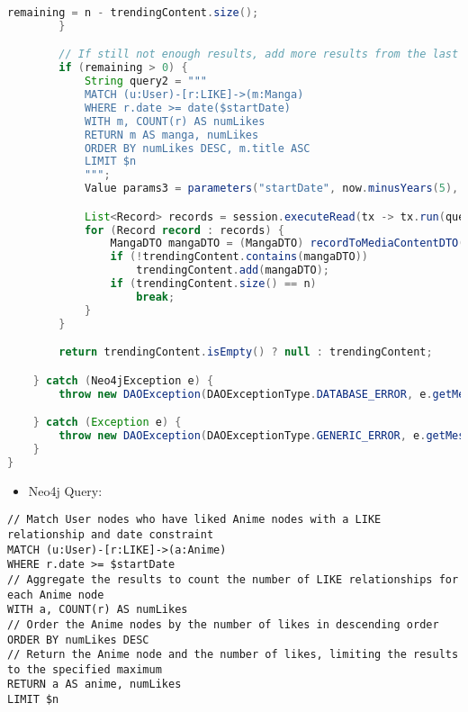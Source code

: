 \begin{mdframed}[style=customstyle]
\begin{lstlisting}[language=java]
            remaining = n - trendingContent.size();
        }

        // If still not enough results, add more results from the last 5 years
        if (remaining > 0) {
            String query2 = """
            MATCH (u:User)-[r:LIKE]->(m:Manga)
            WHERE r.date >= date($startDate)
            WITH m, COUNT(r) AS numLikes
            RETURN m AS manga, numLikes
            ORDER BY numLikes DESC, m.title ASC
            LIMIT $n
            """;
            Value params3 = parameters("startDate", now.minusYears(5), "n", remaining);

            List<Record> records = session.executeRead(tx -> tx.run(query2, params3).list());
            for (Record record : records) {
                MangaDTO mangaDTO = (MangaDTO) recordToMediaContentDTO(record);
                if (!trendingContent.contains(mangaDTO))
                    trendingContent.add(mangaDTO);
                if (trendingContent.size() == n)
                    break;
            }
        }

        return trendingContent.isEmpty() ? null : trendingContent;

    } catch (Neo4jException e) {
        throw new DAOException(DAOExceptionType.DATABASE_ERROR, e.getMessage());

    } catch (Exception e) {
        throw new DAOException(DAOExceptionType.GENERIC_ERROR, e.getMessage());
    }
}\end{lstlisting}
\end{mdframed}

\begin{itemize}
    \item Neo4j Query:
\end{itemize}

\begin{mdframed}[style=customstyle]
\begin{lstlisting}[language=Cypher]
// Match User nodes who have liked Anime nodes with a LIKE relationship and date constraint
MATCH (u:User)-[r:LIKE]->(a:Anime)
WHERE r.date >= $startDate
// Aggregate the results to count the number of LIKE relationships for each Anime node
WITH a, COUNT(r) AS numLikes
// Order the Anime nodes by the number of likes in descending order
ORDER BY numLikes DESC
// Return the Anime node and the number of likes, limiting the results to the specified maximum
RETURN a AS anime, numLikes
LIMIT $n\end{lstlisting}
\end{mdframed}

